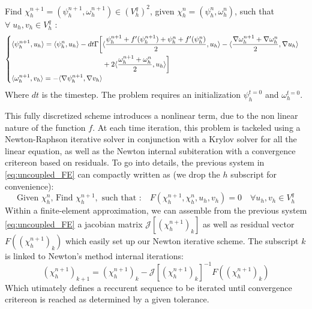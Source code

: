 \documentclass{article}
\begin{document}
\begin{mybox}{}
   Find $\chi_h^{n+1}=(\psi_h^{n+1},\omega_h^{n+1})\in (V^q_h)^2$, given $\chi_h^{n}=(\psi_h^{n},\omega_h^{n})$, such that $\forall \; u_h, v_h \in V^q_h$ :
   \begin{equation}\label{eq:uncoupled_FE}
      \begin{cases}
          \begin{aligned}
              \langle{\psi_h^{n+1}},{u_h}\rangle = \langle{\psi_h^{n}},{u_h}\rangle 
              - dt \Gamma \bigg[&
                  \langle{\frac{\psi_h^{n+1} + f'(\psi_h^{n+1}) + \psi_h^{n} + f'(\psi_h^{n})}{2}},{u_h}\rangle- \langle{\frac{\nabla \omega_h^{n+1}+ \nabla \omega_h^{n}}{2}},{\nabla u_h}\rangle\\
                  &+ 2 \langle{\frac{\omega_h^{n+1} + \omega_h^{n}}{2}},{u_h}\rangle 
              \bigg]
          \end{aligned} \\
          \langle{\omega_h^{n+1}},{v_h}\rangle = -\langle{\nabla \psi_h^{n+1}},{\nabla v_h}\rangle
      \end{cases}
  \end{equation}
Where $dt$ is the timestep. The problem requires an initialization $\psi_h^{t=0}$ and $\omega_h^{t=0}$.
\end{mybox}
This fully discretized scheme introduces a nonlinear term, due to the non linear nature of the function $f$. At each time iteration, this problem is tackeled using a Newton-Raphson iterative solver in conjunction with a Krylov solver for all the linear equation, as well as the Newton internal subiteration with a convergence critereon based on residuals. To go into details, the previous system in \cref{eq:uncoupled_FE} can compactly written as (we drop the $h$ subscript for convenience):
\begin{equation}
   \text{Given } \chi^n_h \text{,  Find } \chi^{n+1}_h,\text{ such that :} \quad F(\chi^{n+1}_h,\chi^{n}_h,u_h,v_h)=0 \quad \forall u_h,v_h \in V_h^q
\end{equation}
Within a finite-element approximation, we can assemble from the previous system \cref{eq:uncoupled_FE} a jacobian matrix $\mathcal{J}\left[\left(\chi^{n+1}_h\right)_{k}\right]$ as well as residual vector $F(\left(\chi^{n+1}_h\right)_{k})$ which easily set up our Newton iterative scheme. The subscript $k$ is linked to Newton's method internal iterations:
\begin{equation}\label{eq:NewtonSH_FE_mixed}
   \left(\chi^{n+1}_h\right)_{k+1}=\left(\chi^{n+1}_h\right)_{k}- \mathcal{J}\left[\left(\chi^{n+1}_h\right)_{k}\right]^{-1}F(\left(\chi^{n+1}_h\right)_{k})
\end{equation}
Which utimately defines a reccurent sequence to be iterated until convergence critereon is reached as determined by a given tolerance.
\end{document}

